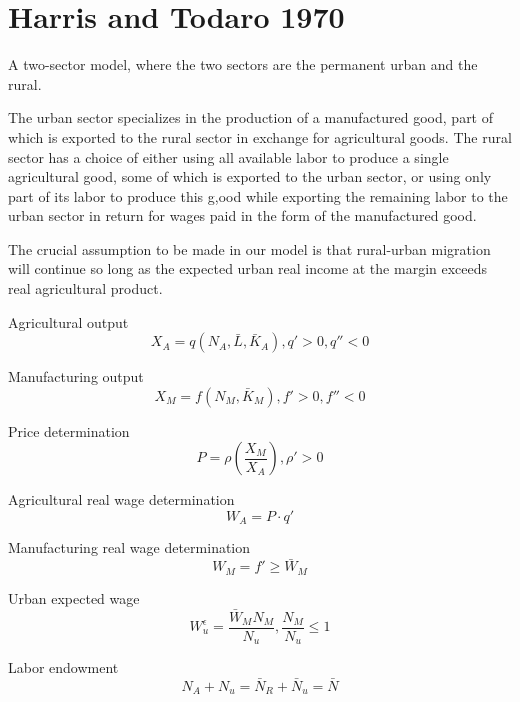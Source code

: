 \documentclass{article}
\numberwithin{equation}{section} %
\begin{document}
\section{Harris and Todaro 1970} %
\label{sec:harris_and_todaro_1970}

A two-sector model, where the two sectors are the permanent urban and the rural.

The urban sector specializes in the production of a manufactured good, part of which is exported to the rural sector in exchange for agricultural goods. The rural sector has a choice of either using all available labor to produce a single agricultural good, some of which is exported to the urban sector, or using only part of its labor to produce this g,ood while exporting the remaining labor to the urban sector in return for wages paid in the form of the manufactured good.

The crucial assumption to be made in our model is that rural-urban migration will continue so long as the expected urban real income at the margin exceeds real agricultural product.

Agricultural output
\begin{equation}
  X_A = q(N_A,\bar L,\bar K_A),q'>0,q''<0
\end{equation}

Manufacturing output
\begin{equation}
  X_M = f(N_M,\bar K_M),f'>0,f''<0
\end{equation}

Price determination
\begin{equation}
  P=\rho(\frac{X_M}{X_A}), \rho'>0
\end{equation}

Agricultural real wage determination
\begin{equation}
  W_A=P\cdot q'
\end{equation}

Manufacturing real wage determination
\begin{equation}
  W_M=f'\geqslant \bar W_M
\end{equation}

Urban expected wage
\begin{equation}
  W_u^\epsilon=\frac{\bar W_M N_M}{N_u},\frac{N_M}{N_u}\leqslant 1
\end{equation}

Labor endowment
\begin{equation}
  N_A+N_u=\bar N_R+\bar N_u=\bar N  
\end{equation}
\end{document}
